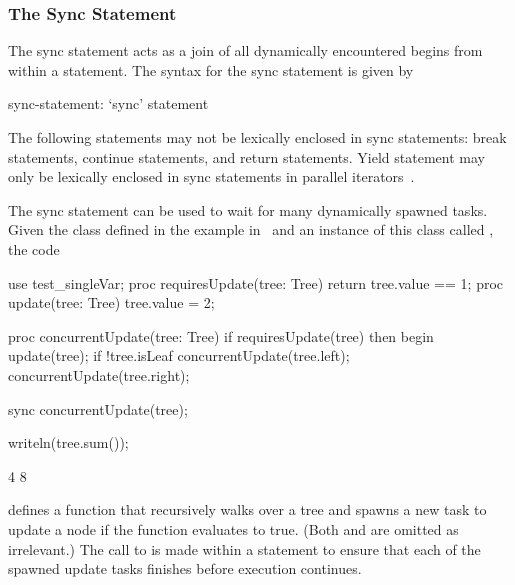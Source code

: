 \subsubsection{The Sync Statement}
\label{Sync_Statement}

The sync statement acts as a join of all dynamically encountered
begins from within a statement.  The syntax for the sync statement is
given by
\begin{syntax}
sync-statement:
  `sync' statement
\end{syntax}
The following statements may not be lexically enclosed in
sync statements: break statements, continue statements, and
return statements.  Yield statement may only be lexically enclosed in
sync statements in parallel iterators~.

\begin{example}
The sync statement can be used to wait for many dynamically spawned
tasks.  Given the  class defined in the example
in~ and an instance of this class
called , the code
\begin{chapelpre}
use test\_singleVar;
proc requiresUpdate(tree: Tree) {
  return tree.value == 1;
}
proc update(tree: Tree) {
  tree.value = 2;
}
\end{chapelpre}
\begin{chapel}
proc concurrentUpdate(tree: Tree) {
  if requiresUpdate(tree) then
    begin update(tree);
  if !tree.isLeaf {
    concurrentUpdate(tree.left);
    concurrentUpdate(tree.right);
  }
}

sync concurrentUpdate(tree);
\end{chapel}
\begin{chapelpost}
writeln(tree.sum());
\end{chapelpost}
\begin{chapeloutput}
4
8
\end{chapeloutput}
defines a function  that recursively walks over
a tree and spawns a new task to update a node if the
function  evaluates to true.
(Both  and  are omitted as
irrelevant.)  The call to  is made within
a  statement to ensure that each of the spawned update
tasks finishes before execution continues.
\end{example}


